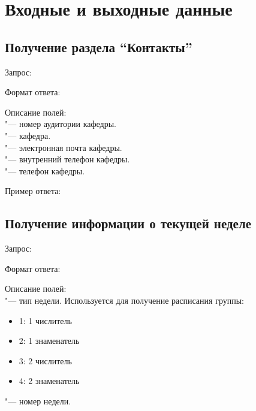 \chapter{Входные и выходные данные}
\label{ch:io}

\section{Получение раздела ``Контакты''}
\label{sec:contacts}

Запрос: 

Формат ответа:
\begin{listing}[H]
\end{listing}
\vspace{-0.75cm}

Описание полей:\\
 "--- номер аудитории кафедры.\\
 "--- кафедра.\\
 "--- электронная почта кафедры.\\
 "--- внутренний телефон кафедры.\\
 "--- телефон кафедры.

Пример ответа:
\begin{listing}[H]
\end{listing}
\vspace{-0.75cm}

\section{Получение информации о текущей неделе}
\label{sec:faq}

Запрос: 

Формат ответа:
\begin{listing}[H]
\end{listing}
\vspace{-0.75cm}

Описание полей:\\
 "--- тип недели.
Используется для получение расписания группы:
\begin{itemize}
  \item 1: 1 числитель
  \item 2: 1 знаменатель
  \item 3: 2 числитель
  \item 4: 2 знаменатель
\end{itemize}
 "--- номер недели.

